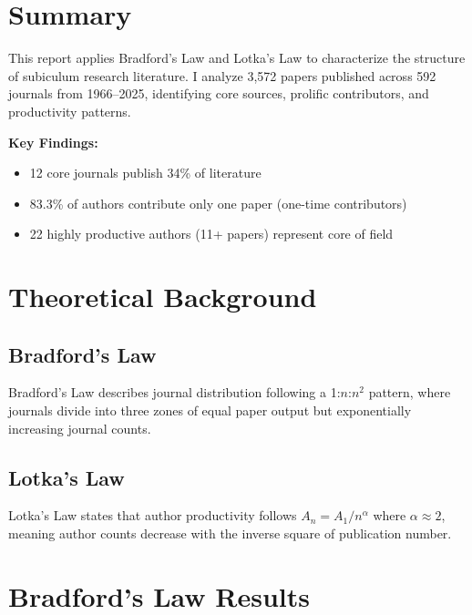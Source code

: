 \documentclass{../latex/analysis_report}
\begin{document}
\maketitle

\section{Summary}

This report applies Bradford's Law and Lotka's Law to characterize the structure of subiculum research literature. I analyze 3,572 papers published across 592 journals from 1966--2025, identifying core sources, prolific contributors, and productivity patterns.

\vspace{8pt}
\noindent\textbf{Key Findings:}
\vspace{-2pt}
\begin{itemize}[noitemsep,topsep=0pt]
    \item 12 core journals publish 34\% of literature
    \item 83.3\% of authors contribute only one paper (one-time contributors)
    \item 22 highly productive authors (11+ papers) represent core of field
\end{itemize}

\section{Theoretical Background}

\subsection{Bradford's Law}

Bradford's Law describes journal distribution following a 1:$n$:$n^2$ pattern, where journals divide into three zones of equal paper output but exponentially increasing journal counts.

\subsection{Lotka's Law}

Lotka's Law states that author productivity follows $A_n = A_1/n^\alpha$ where $\alpha \approx 2$, meaning author counts decrease with the inverse square of publication number.

\section{Bradford's Law Results}
\end{document}
